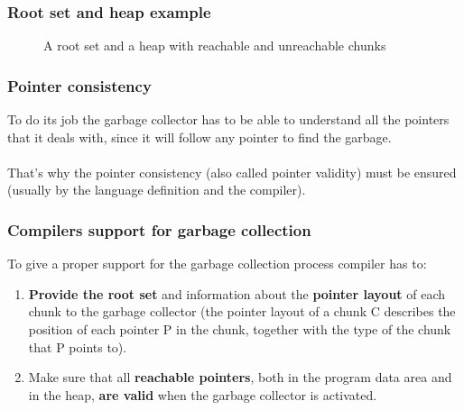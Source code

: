 \documentclass[presentation]{beamer}
\begin{document}
\begin{frame}
    \frametitle{Root set and heap example}
    \begin{figure}
        \centering
        \caption{A root set and a heap with reachable and unreachable chunks}
        \label{fig:my_label}
    \end{figure}
\end{frame}

\begin{frame}
    \frametitle{Pointer consistency}
    \justifying
    To do its job the garbage collector has to be able to understand all the pointers that it deals with, since it will follow any pointer to find the garbage. 
    \\~\\
    That's why the pointer  consistency (also called pointer validity) must be ensured (usually by the language definition and the compiler).
\end{frame}

\begin{frame}
    \frametitle{Compilers support for garbage collection}
    \justifying
    To give a proper support for the garbage collection process compiler has to:
    
    \begin{enumerate}
    \justifying
        \item \textbf{Provide the root set} and information about the \textbf{pointer layout} of each chunk to the garbage collector  (the pointer layout of a chunk C describes the position of each pointer P in the chunk, together with the type of the chunk that P points to). 
        \item Make sure that all \textbf{reachable pointers}, both in the program data area and in the heap, \textbf{are valid} when the garbage collector is activated.
    \end{enumerate}
\end{frame}
\end{document}
